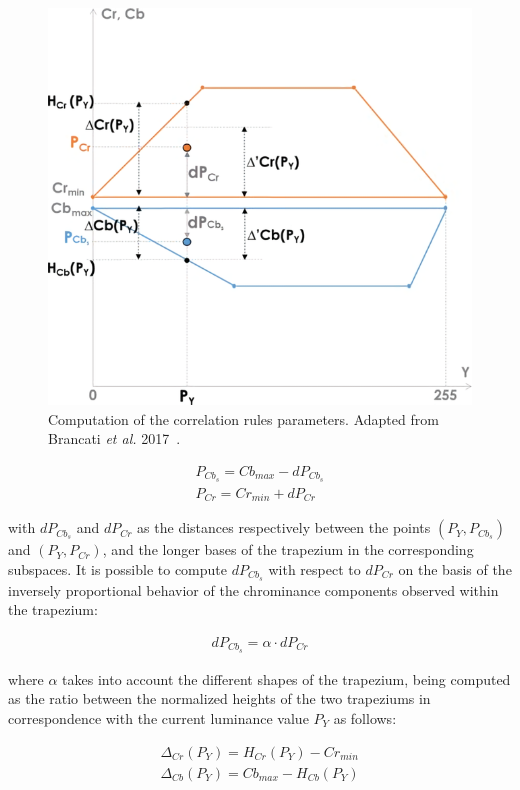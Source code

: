 \begin{figure}[h]
	\centering
	\includegraphics[width=0.6\linewidth]{images/approaches/thresholding/trapezia_params.png}
	\caption{Computation of the correlation rules parameters. Adapted from Brancati \textit{et al.} 2017~\cite{brancati2017human}.}
	\label{fig:trapeze-params}
\end{figure}

\begin{equation}
\begin{aligned}
P_{C b_{s}} = Cb_{max} - dP_{C b_{s}}\\
P_{Cr} = Cr_{min} + dP_{Cr}
\end{aligned}
\end{equation}

with $dP_{C b_{s}}$ and $dP_{Cr}$ as the distances respectively between the points $(P_Y, P_{C b_{s}})$ and $(P_Y, P_{Cr})$, and the longer bases of the trapezium in the corresponding subspaces.
It is possible to compute $dP_{C b_{s}}$ with respect to $dP_{Cr}$ on the basis of the inversely proportional behavior of the chrominance components observed within the trapezium:

\begin{equation}
\begin{aligned}
dP_{C b_{s}} = \alpha \cdot dP_{Cr}
\end{aligned}
\end{equation}

where $\alpha$ takes into account the different shapes of the trapezium, being computed as the ratio between the normalized heights of the two trapeziums in correspondence with the current luminance value $P_Y$ as follows:

\begin{equation}
\begin{aligned}
\Delta_{Cr}(P_Y) = H_{Cr}(P_Y) - Cr_{min}\\
\Delta_{Cb}(P_Y) = Cb_{max} - H_{Cb}(P_Y)
\end{aligned}
\end{equation}

